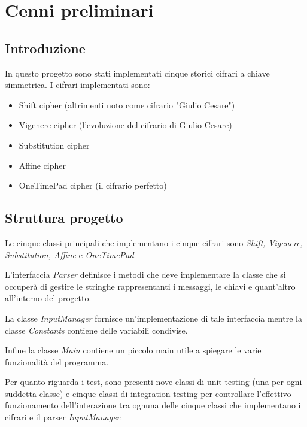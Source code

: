 \chapter{Cenni preliminari}

	\section{Introduzione}
		In questo progetto sono stati implementati cinque storici cifrari a chiave simmetrica. I cifrari implementati sono:
		\begin{itemize}
			\item Shift cipher (altrimenti noto come cifrario "Giulio Cesare")
			\item Vigenere cipher (l'evoluzione del cifrario di Giulio Cesare)
			\item Substitution cipher
			\item Affine cipher
			\item OneTimePad cipher (il cifrario perfetto)
		\end{itemize}
		
	\section{Struttura progetto}
		Le cinque classi principali che implementano i cinque cifrari sono \emph{Shift, Vigenere, Substitution, Affine} e \emph{OneTimePad}.
		
		L'interfaccia \emph{Parser} definisce i metodi che deve implementare la classe che si occuperà di gestire le stringhe rappresentanti i messaggi, le chiavi e quant'altro all'interno del progetto.
		
		La classe \emph{InputManager} fornisce un'implementazione di tale interfaccia mentre la classe \emph{Constants} contiene delle variabili condivise.
		
		Infine la classe \emph{Main} contiene un piccolo main utile a spiegare le varie funzionalità del programma.
		
		Per quanto riguarda i test, sono presenti nove classi di unit-testing (una per ogni suddetta classe) e cinque classi di integration-testing per controllare l'effettivo funzionamento dell'interazione tra ognuna delle cinque classi che implementano i cifrari e il parser \emph{InputManager}.